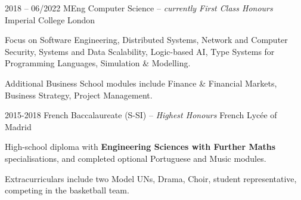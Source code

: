 \begin{entrylist}
    \entry
    {2018 -- 06/2022}
    {MEng Computer Science -- \emph{{\small currently} First Class Honours}}
    {Imperial College London}
    {
        Focus on Software Engineering,
        Distributed Systems,
        Network and Computer Security,
        Systems and Data Scalability,
        Logic-based AI,
        Type Systems for Programming Languages,
        Simulation \& Modelling.

        \para
        Additional Business School modules include Finance \& Financial Markets,
        Business Strategy, Project Management.
    }
    \entry
    {2015-2018}
    {French Baccalaureate (S-SI) --  \emph{Highest Honours}}
    {French Lycée of Madrid}
    {
        High-school diploma with \textbf{Engineering Sciences with Further Maths} specialisations,
        and completed optional Portuguese and Music modules.

        \para
        Extracurriculars include two Model UNs, Drama, Choir, student representative, competing in
    the basketball team.
    }
\end{entrylist}
